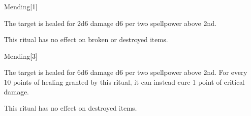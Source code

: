 \begin{spellsection}{Mending}[1]
    \begin{spellheader}
    \end{spellheader}
    \begin{spellcontent}
        \begin{spelltargetinginfo}
        \end{spelltargetinginfo}
        \begin{spelleffects}

            \spelleffect The target is healed for 2d6 damage \add d6 per two spellpower above 2nd. 
        \end{spelleffects}
    \end{spellcontent}
    \begin{spellfooter}
        \spellnotes This ritual has no effect on broken or destroyed items. 
    \end{spellfooter}
\end{spellsection}

\begin{spellsection}[Greater]{Mending}[3]
    \begin{spellheader}
    \end{spellheader}
    \begin{spellcontent}
        \begin{spelltargetinginfo}
        \end{spelltargetinginfo}
        \begin{spelleffects}

            \spelleffect The target is healed for 6d6 damage \add d6 per two spellpower above 2nd. For every 10 points of healing granted by this ritual, it can instead cure 1 point of critical damage.
        \end{spelleffects}
    \end{spellcontent}
    \begin{spellfooter}
        \spellnotes This ritual has no effect on destroyed items.
    \end{spellfooter}
\end{spellsection}

